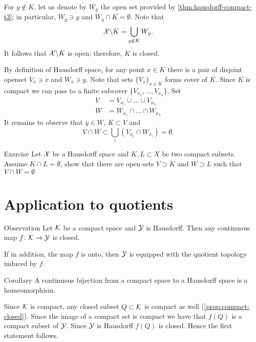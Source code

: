 For $y\notin K$, let us denote by $W_y$ the open set provided by \ref{thm:hausdorff-compact-t3};
in particular, $W_y\ni y$ and $W_y\cap K=\emptyset$.
Note that 
\[\mathcal{X}\backslash K=\bigcup_{y\notin K} W_y.\]
It follows that $\mathcal{X}\backslash K$ is open; therefore, $K$ is closed.
\qeds


By definition of Hausdorff space,
for any point $x\in K$ there is a pair of disjoint openset $V_x\ni x$ and $W_x\ni y$.
Note that sets $\{V_x\}_{x\in K}$ forms cover of $K$.
Since $K$ is compact we can pass to a finite subcover $\{V_{x_1},\dots , V_{x_n}\}$.
Set 
\begin{align*}
V&=V_{x_1}\cup\dots \cup V_{x_n}
\\
W&=W_{x_1}\cap\dots \cap W_{x_n}
\end{align*}
It remains to observe that $y\in W$, $K\subset V$ and 
\[V\cap W\subset \bigcup_i(V_{x_i}\cap W_{x_i})=\emptyset.\]
\qedsf

\begin{thm}{Exercise}
Let $\mathcal{X}$ be a Hausdorff space and $K,L\subset X$ be two compact subsets.
Assume $K\cap L=\emptyset$, show that there are open sets $V\supset K$ and $W\supset L$
such that $V\cap W=\emptyset$
\end{thm}

\section{Application to quotients}

\begin{thm}{Observation}\label{obs:compact-to-hausdorff}
Let $\mathcal{K}$ be a compact space and $\mathcal{Y}$ is Hausdorff.
Then any continuous map $f\colon\mathcal{K}\to\mathcal{Y}$ is closed.

If in addition, the map $f$ is onto, then $\mathcal{Y}$ is equipped with the quotient topology induced by $f$. 
\end{thm}

\begin{thm}{Corollary}
A continuous bijection from a compact space to a Hausdorff space is a homeomorphism.
\end{thm}


Since $\mathcal{K}$ is compact, any closed subset $Q\subset \mathcal{K}$ is compact as well (\ref{prop:compact-closed}).
Since the image of a compact set is compact we have that $f(Q)$ is a compact subset of $\mathcal{Y}$.
Since $\mathcal{Y}$ is Hausdorff $f(Q)$ is closed.
Hence the first statement follows.

